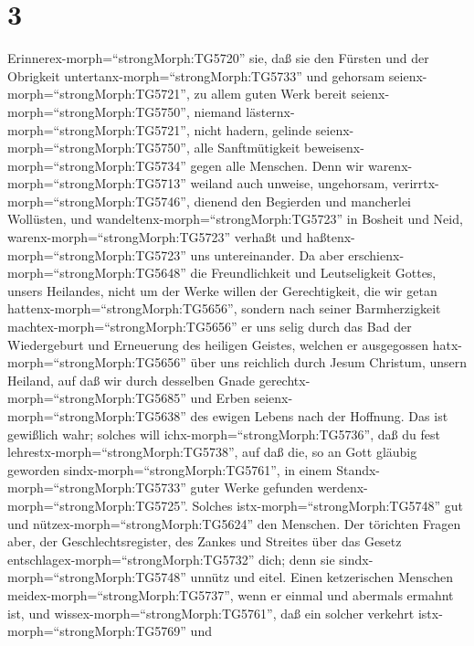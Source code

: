 \hypertarget{section-2}{%
\section{3}\label{section-2}}

 Erinnerex-morph=``strongMorph:TG5720'' sie, daß sie den
Fürsten und der Obrigkeit untertanx-morph=``strongMorph:TG5733'' und
gehorsam seienx-morph=``strongMorph:TG5721'', zu allem guten Werk bereit
seienx-morph=``strongMorph:TG5750'',  niemand
lästernx-morph=``strongMorph:TG5721'', nicht hadern, gelinde
seienx-morph=``strongMorph:TG5750'', alle Sanftmütigkeit
beweisenx-morph=``strongMorph:TG5734'' gegen alle Menschen. 
Denn wir warenx-morph=``strongMorph:TG5713'' weiland auch unweise,
ungehorsam, verirrtx-morph=``strongMorph:TG5746'', dienend den Begierden
und mancherlei Wollüsten, und wandeltenx-morph=``strongMorph:TG5723'' in
Bosheit und Neid, warenx-morph=``strongMorph:TG5723'' verhaßt und
haßtenx-morph=``strongMorph:TG5723'' uns untereinander.  Da
aber erschienx-morph=``strongMorph:TG5648'' die Freundlichkeit und
Leutseligkeit Gottes, unsers Heilandes,  nicht um der Werke
willen der Gerechtigkeit, die wir getan
hattenx-morph=``strongMorph:TG5656'', sondern nach seiner Barmherzigkeit
machtex-morph=``strongMorph:TG5656'' er uns selig durch das Bad der
Wiedergeburt und Erneuerung des heiligen Geistes,  welchen
er ausgegossen hatx-morph=``strongMorph:TG5656'' über uns reichlich
durch Jesum Christum, unsern Heiland,  auf daß wir durch
desselben Gnade gerechtx-morph=``strongMorph:TG5685'' und Erben
seienx-morph=``strongMorph:TG5638'' des ewigen Lebens nach der Hoffnung.
 Das ist gewißlich wahr; solches will
ichx-morph=``strongMorph:TG5736'', daß du fest
lehrestx-morph=``strongMorph:TG5738'', auf daß die, so an Gott gläubig
geworden sindx-morph=``strongMorph:TG5761'', in einem
Standx-morph=``strongMorph:TG5733'' guter Werke gefunden
werdenx-morph=``strongMorph:TG5725''. Solches
istx-morph=``strongMorph:TG5748'' gut und
nütze\textbar x-morph=``strongMorph:TG5624'' den Menschen. 
Der törichten Fragen aber, der Geschlechtsregister, des Zankes und
Streites über das Gesetz entschlagex-morph=``strongMorph:TG5732'' dich;
denn sie sindx-morph=``strongMorph:TG5748'' unnütz und eitel.
 Einen ketzerischen Menschen
meidex-morph=``strongMorph:TG5737'', wenn er einmal und abermals ermahnt
ist,  und wissex-morph=``strongMorph:TG5761'', daß ein
solcher verkehrt istx-morph=``strongMorph:TG5769'' und

